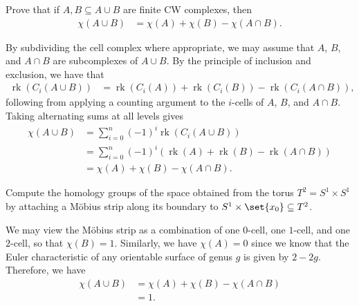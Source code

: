 \documentclass[10pt]{mypackage}
\begin{document}
\RaggedRight
\begin{problem}[Problem 1]
  Prove that if $A,B\subseteq A\cup B$ are finite CW complexes, then
  \begin{align*}
    \chi\left( A\cup B \right) &= \chi(A) + \chi(B) - \chi\left( A\cap B \right).
  \end{align*}
\end{problem}
\begin{solution}
  By subdividing the cell complex where appropriate, we may assume that $A$, $B$, and $A\cap B$ are subcomplexes of $A\cup B$. By the principle of inclusion and exclusion, we have that
  \begin{align*}
    \operatorname{rk}\left( C_i(A\cup B) \right) &= \operatorname{rk}\left( C_i(A) \right) + \operatorname{rk}\left( C_i(B) \right) - \operatorname{rk}\left( C_i\left( A\cap B \right) \right),
  \end{align*}
  following from applying a counting argument to the $i$-cells of $A$, $B$, and $A\cap B$. Taking alternating sums at all levels gives
  \begin{align*}
    \chi\left( A\cup B \right) &= \sum_{i=0}^{n} \left( -1 \right)^{i} \operatorname{rk}\left( C_i\left( A\cup B \right) \right)\\
                               &= \sum_{i=0}^{n} \left( -1 \right)^{i} \left( \operatorname{rk}\left( A \right) + \operatorname{rk}\left( B \right) - \operatorname{rk}\left( A\cap B \right) \right)\\
                               &= \chi\left( A \right) + \chi\left( B \right) - \chi\left( A\cap B \right).
  \end{align*}
\end{solution}
\begin{problem}[Problem 2]
  Compute the homology groups of the space obtained from the torus $T^2 = S^1\times S^1$ by attaching a Möbius strip along its boundary to $S^1\times \set{x_0}\subseteq T^2$.
\end{problem}
\begin{solution}
  We may view the Möbius strip as a combination of one $0$-cell, one $1$-cell, and one $2$-cell, so that $\chi\left( B \right) = 1$. Similarly, we have $\chi\left( A \right) = 0$ since we know that the Euler characteristic of any orientable surface of genus $g$ is given by $2-2g$. Therefore, we have
  \begin{align*}
    \chi\left( A\cup B \right) &= \chi\left( A \right) + \chi\left( B \right) - \chi\left( A\cap B \right)\\
                               &= 1.
  \end{align*}

\end{solution}
\end{document}
